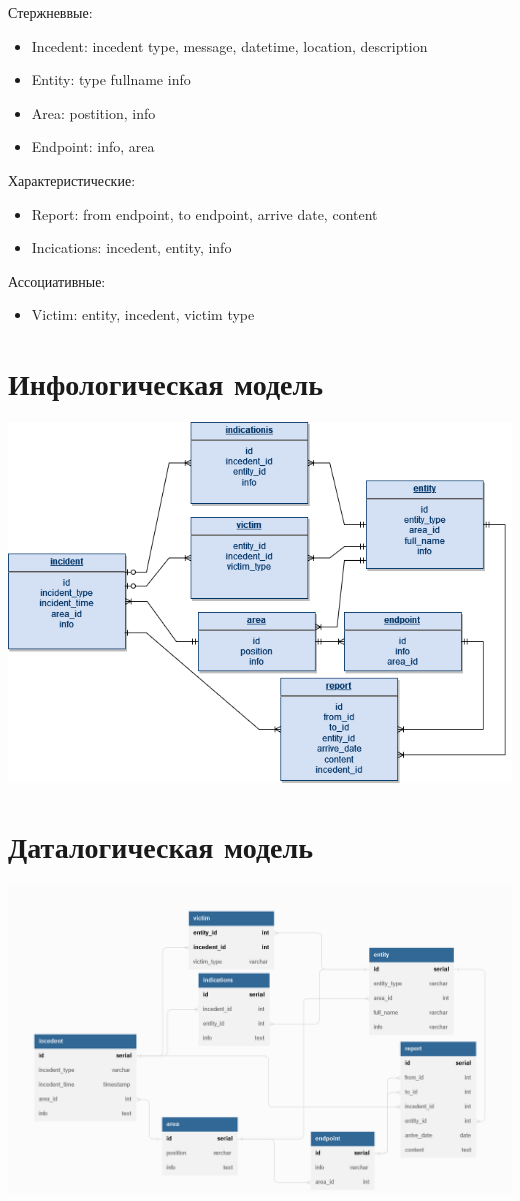 \documentclass{article}
\begin{document}
Стержневвые:
\begin{itemize}
  \item Incedent: incedent type, message, datetime, location, description
  \item Entity: type fullname info
  \item Area: postition, info
  \item Endpoint: info, area
\end{itemize}
Характеристические:
\begin{itemize}
  \item Report: from endpoint, to endpoint, arrive date, content
  \item Incications: incedent, entity, info
\end{itemize}
Ассоциативные:
\begin{itemize}
  \item Victim: entity, incedent, victim type
\end{itemize}

\section{Инфологическая модель}
\begin{center}
  \includegraphics[scale=0.6]{infodiagram.png}
\end{center}

\section{Даталогическая модель}
\includegraphics[width=\textwidth]{dbdiagram.png}
\end{document}
